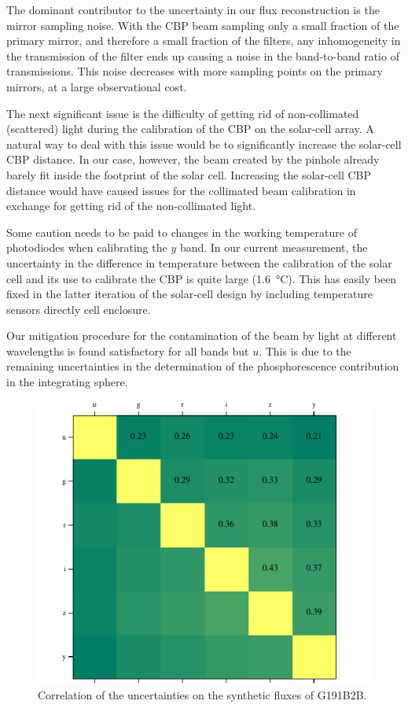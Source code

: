 The dominant contributor to the uncertainty in our flux reconstruction
is the mirror sampling noise. With the CBP beam sampling only a small
fraction of the primary mirror, and therefore a small fraction of the
filters, any inhomogeneity in the transmission of the filter ends up
causing a noise in the band-to-band ratio of transmissions. This noise
decreases with more sampling points on the primary mirrors, at a large
observational cost.

The next significant issue is the difficulty of getting rid of
non-collimated (scattered) light during the calibration of the CBP on
the solar-cell array. A natural way to deal with this issue would be
to significantly increase the solar-cell CBP distance. In our case, however, the beam created by the \bpinhole pinhole already barely fit
inside the footprint of the solar cell. Increasing the solar-cell CBP
distance would have caused issues for the collimated beam calibration in exchange
for getting rid of the non-collimated light.

Some caution needs to be paid to changes in the working temperature
of photodiodes when calibrating the $y$ band. In our current measurement,
the uncertainty in the difference in temperature between the
calibration of the solar cell and its use to calibrate the CBP is
quite large (\SI{1.6}{\celsius}). This has easily been fixed in the latter
iteration of the solar-cell design by including temperature sensors
directly cell enclosure.

Our mitigation procedure for the contamination of the beam by light
at different wavelengths is found satisfactory for all bands but $u$. This
is due to the remaining uncertainties in the determination of the
phosphorescence contribution in the integrating sphere.

\begin{figure}
  \centering
  \includegraphics[width=1\linewidth]{fig/bandcorrelation.pdf}
  \caption{Correlation of the uncertainties on the synthetic fluxes of G191B2B.}
  \label{fig:correlation}
\end{figure}

